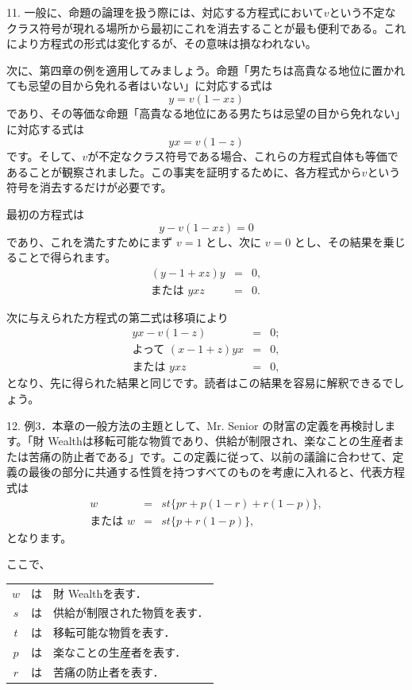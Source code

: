 \documentclass[a4paper,11pt,openany]{ltjsbook}
\begin{document}
11. 一般に、命題の論理を扱う際には、対応する方程式において$v$という不定なクラス符号が現れる場所から最初にこれを消去することが最も便利である。これにより方程式の形式は変化するが、その意味は損なわれない。

次に、第四章の例を適用してみましょう。命題「男たちは高貴なる地位に置かれても忌望の目から免れる者はいない」に対応する式は
\[
y = v(1 - xz)
\]
であり、その等価な命題「高貴なる地位にある男たちは忌望の目から免れない」に対応する式は
\[
yx = v(1 - z)
\]
です。そして、$v$が不定なクラス符号である場合、これらの方程式自体も等価であることが観察されました。この事実を証明するために、各方程式から$v$という符号を消去するだけが必要です。

最初の方程式は
\[
y - v(1 - xz) = 0
\]
であり、これを満たすためにまず $v = 1$ とし、次に $v = 0$ とし、その結果を乗じることで得られます。
\begin{eqnarray*}
(y - 1 + xz)y &=& 0,\\
\textrm{または } yxz &=& 0.
\end{eqnarray*}

次に与えられた方程式の第二式は移項により
\begin{eqnarray*}
yx - v(1 - z) &=& 0; \\
\textrm{よって } (x - 1 + z)yx &=& 0,\\
\textrm{または } yxz &=& 0,
\end{eqnarray*}
となり、先に得られた結果と同じです。読者はこの結果を容易に解釈できるでしょう。

12. 例3．本章の一般方法の主題として、Mr. Senior の財富の定義を再検討します。「財 Wealthは移転可能な物質であり、供給が制限され、楽なことの生産者または苦痛の防止者である」です。この定義に従って、以前の議論に合わせて、定義の最後の部分に共通する性質を持つすべてのものを考慮に入れると、代表方程式は
\begin{eqnarray*}
w &=& st \{pr + p(1 - r) + r(1 - p)\}, \\
\textrm{または } w &=& st \{p + r(1 - p)\},
\end{eqnarray*}
となります。

ここで、
\begin{tabular}{c l l}
$w$ & は & 財 Wealthを表す．\\
$s$ & は & 供給が制限された物質を表す．\\
$t$ & は & 移転可能な物質を表す．\\
$p$ & は & 楽なことの生産者を表す．\\
$r$ & は & 苦痛の防止者を表す．\\
\end{tabular}
\end{document}
